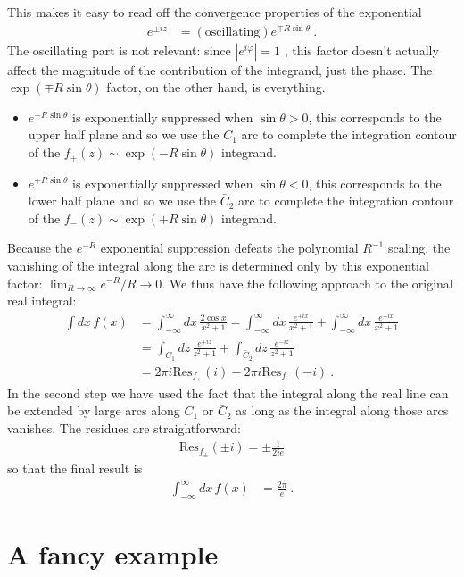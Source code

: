 This makes it easy to read off the convergence properties of the exponential
\begin{align}
  e^{\pm iz} &= (\text{oscillating})e^{\mp R\sin\theta} \ .
\end{align}
The oscillating part is not relevant: since $|e^{i\varphi}| = 1$ , this factor doesn't actually affect the magnitude of the contribution of the integrand, just the phase. The $\exp(\mp R\sin\theta)$ factor, on the other hand, is everything. 
\begin{itemize}
  \item $e^{- R\sin\theta}$ is exponentially suppressed when $\sin\theta > 0$, this corresponds to the upper half plane and so we use the $C_1$ arc to complete the integration contour of the $f_+(z)\sim \exp(-R\sin\theta)$ integrand.
  \item $e^{+ R\sin\theta}$ is exponentially suppressed when $\sin\theta < 0$, this corresponds to the lower half plane and so we use the $\bar C_2$ arc to complete the integration contour of the $f_-(z)\sim \exp(+R\sin\theta)$ integrand.
\end{itemize}
Because the $e^{-R}$ exponential suppression defeats the polynomial $R^{-1}$ scaling, the vanishing of the integral along the arc is determined only by this exponential factor: $\lim_{R\to\infty}e^{-R}/R\to 0$. We thus have the following approach to the original real integral:
\begin{align}
  \int dx\, f(x) &= \int_{-\infty}^\infty  dx\,
\frac{2\cos x}{x^2+1} 
  = 
  \int_{-\infty}^\infty  dx\,
  \frac{e^{+ix}}{x^2+1} 
  +
  \int_{-\infty}^\infty  dx\,
  \frac{e^{-ix}}{x^2+1} 
  \\ 
  &=
  \int_{C_1} dz\, 
  \frac{e^{+iz}}{z^2+1} 
  +
  \int_{\bar C_2} dz\, 
  \frac{e^{-iz}}{z^2+1} 
  \\
  &=
  2\pi i \text{Res}_{f_+}(i)
  -
  2\pi i \text{Res}_{f_-}(-i)
\ .
\end{align}
In the second step we have used the fact that the integral along the real line can be extended by large arcs along $C_1$ or $\bar C_2$ as long as the integral along those arcs vanishes. The residues are straightforward: 
\begin{align}
  \text{Res}_{f_\pm}(\pm i) = \pm \frac{1}{2ie}
\end{align}
so that the final result is
\begin{align}
  \int_{-\infty}^\infty dx\, f(x) &= \frac{2\pi}{e} \ .
\end{align}

\section{A fancy example}

